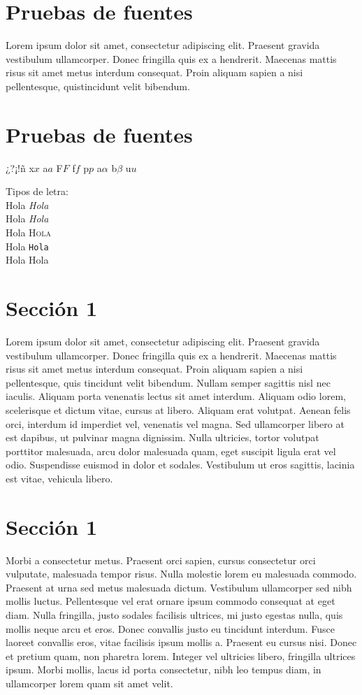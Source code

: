 \documentclass[]{aleph-notas-test}
\begin{document}
\encabezado

\section{Pruebas de fuentes}

Lorem ipsum dolor sit amet, consectetur adipiscing elit. Praesent gravida vestibulum ullamcorper. Donec fringilla quis ex a hendrerit. Maecenas mattis risus sit amet metus interdum consequat. Proin aliquam sapien a nisi pellentesque, quistincidunt velit bibendum.

\section{Pruebas de fuentes}

¿?¡!ñ x$x$ a$a$ F$F$ f$f$ p$p$ a$\alpha$ b$\beta$ u$u$

Tipos de letra:\\
Hola \textit{Hola} \\ 
Hola \textsl{Hola} \\
Hola \textsc{Hola} \\
Hola \texttt{Hola} \\
Hola \textsf{Hola}

\section{Sección 1}

Lorem ipsum dolor sit amet, consectetur adipiscing elit. Praesent gravida vestibulum ullamcorper. Donec fringilla quis ex a hendrerit. Maecenas mattis risus sit amet metus interdum consequat. Proin aliquam sapien a nisi pellentesque, quis tincidunt velit bibendum. Nullam semper sagittis nisl nec iaculis. Aliquam porta venenatis lectus sit amet interdum. Aliquam odio lorem, scelerisque et dictum vitae, cursus at libero. Aliquam erat volutpat. Aenean felis orci, interdum id imperdiet vel, venenatis vel magna. Sed ullamcorper libero at est dapibus, ut pulvinar magna dignissim. Nulla ultricies, tortor volutpat porttitor malesuada, arcu dolor malesuada quam, eget suscipit ligula erat vel odio. Suspendisse euismod in dolor et sodales. Vestibulum ut eros sagittis, lacinia est vitae, vehicula libero.

\section*{Sección 1}

Morbi a consectetur metus. Praesent orci sapien, cursus consectetur orci vulputate, malesuada tempor risus. Nulla molestie lorem eu malesuada commodo. Praesent at urna sed metus malesuada dictum. Vestibulum ullamcorper sed nibh mollis luctus. Pellentesque vel erat ornare ipsum commodo consequat at eget diam. Nulla fringilla, justo sodales facilisis ultrices, mi justo egestas nulla, quis mollis neque arcu et eros. Donec convallis justo eu tincidunt interdum. Fusce laoreet convallis eros, vitae facilisis ipsum mollis a. Praesent eu cursus nisi. Donec et pretium quam, non pharetra lorem. Integer vel ultricies libero, fringilla ultrices ipsum. Morbi mollis, lacus id porta consectetur, nibh leo tempus diam, in ullamcorper lorem quam sit amet velit.  
\end{document}
